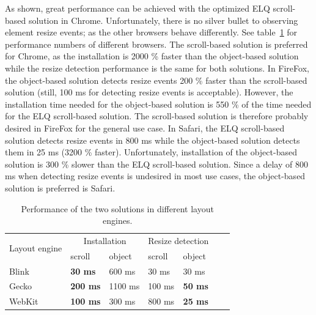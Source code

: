 \documentclass[a4paper,11pt]{kth-mag}
\begin{document}
        As shown, great performance can be achieved with the optimized \gls{ELQ} scroll-based solution in Chrome.
        Unfortunately, there is no silver bullet to observing element resize events; as the other browsers behave differently.
        See table~\ref{table:erd-layout-engines} for performance numbers of different browsers.
        The scroll-based solution is preferred for Chrome, as the installation is 2000 \% faster than the object-based solution while the resize detection performance is the same for both solutions.
        In FireFox, the object-based solution detects resize events 200 \% faster than the scroll-based solution (still, 100 ms for detecting resize events is acceptable).
        However, the installation time needed for the object-based solution is 550 \% of the time needed for the \gls{ELQ} scroll-based solution.
        The scroll-based solution is therefore probably desired in FireFox for the general use case.
        In Safari, the \gls{ELQ} scroll-based solution detects resize events in 800 ms while the object-based solution detects them in 25 ms (3200 \% faster).
        Unfortunately, installation of the object-based solution is 300 \% slower than the \gls{ELQ} scroll-based solution.
        Since a delay of 800 ms when detecting resize events is undesired in most use cases, the object-based solution is preferred is Safari.
        \begin{table}[ht]\center
          \tiny
          \begin{tabular}[t]{ l l l l l l l }
            \multirow{2}{*}{Layout engine} & \multicolumn{2}{c}{Installation} & \multicolumn{2}{c}{Resize detection} \\
            & scroll & object & scroll & object \\
            \hline
            Blink   & \textbf{30 ms}   & 600 ms    & 30 ms   & 30 ms           \\
            Gecko   & \textbf{200 ms}  & 1100 ms   & 100 ms  & \textbf{50 ms}  \\
            WebKit  & \textbf{100 ms}  & 300 ms    & 800 ms  & \textbf{25 ms}  \\
          \end{tabular}
          \caption{Performance of the two solutions in different layout engines.}
          \label{table:erd-layout-engines}
        \end{table}
\end{document}
